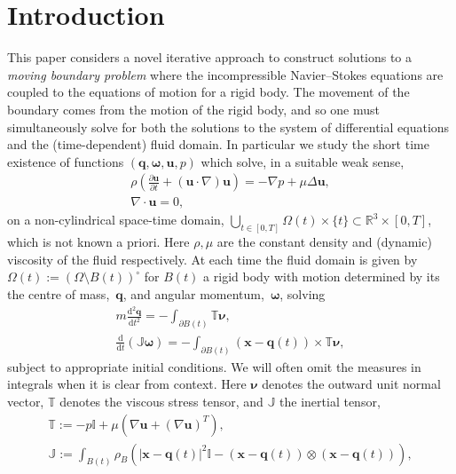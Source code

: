 \documentclass[a4paper]{amsart}
\numberwithin{equation}{section}
\newcommand{\ddt}[1]{\frac{\partial #1}{\partial t}}
\newcommand{\grad}{\nabla}
\newcommand{\Div}{\nabla \cdot}
\theoremstyle{plain}
\newcommand{\mbf}[1]{\mathbf{#1}}
\newcommand{\mbb}[1]{\mathbb{#1}}
\begin{document}
\section{Introduction}
\label{section: FSI Intro}
This paper considers a novel iterative approach to construct solutions to a \emph{moving boundary problem} where the incompressible Navier--Stokes equations are coupled to the equations of motion for a rigid body.
The movement of the boundary comes from the motion of the rigid body, and so one must simultaneously solve for both the solutions to the system of differential equations and the (time-dependent) fluid domain.
In particular we study the short time existence of functions $(\mbf{q}, \boldsymbol{\omega}, \mbf{u}, p)$ which solve, in a suitable weak sense,
\begin{subequations}
\label{eqn: FSI fluid}
\begin{gather}
	\rho \left( \ddt{\mbf{u}} + (\mbf{u} \cdot \grad) \mbf{u} \right) = - \grad p + \mu \Delta \mbf{u},\label{FSI1}\\
	\Div \mbf{u} = 0,\label{FSI2}
\end{gather}
\end{subequations}
on a non-cylindrical space-time domain, $\bigcup_{t \in [0,T]} \Omega(t) \times \{ t \} \subset \mbb{R}^3 \times [0,T]$, which is not known a priori.
Here $\rho, \mu$ are the constant density and (dynamic) viscosity of the fluid respectively.
At each time the fluid domain is given by $\Omega(t) := (\Omega \setminus B(t))^\circ$ for $B(t)$ a rigid body with motion determined by its the centre of mass,~$\mbf{q}$, and angular momentum,~$\boldsymbol{\omega}$, solving
\begin{subequations}
\label{eqn: FSI rigid body}
\begin{gather}
	m \frac{\mathrm{d}^2 \mbf{q}}{\mathrm{d}t^2} = - \int_{\partial B(t)} \mbb{T} \boldsymbol{\nu},\label{FSI3}\\
	\frac{\mathrm{d}}{\mathrm{d}t} \left( \mbb{J} \boldsymbol{\omega} \right) = - \int_{\partial B(t)} (\mbf{x} - \mbf{q}(t)) \times \mbb{T} \boldsymbol{\nu}, \label{FSI4}
\end{gather}
\end{subequations}
subject to appropriate initial conditions.
We will often omit the measures in integrals when it is clear from context.
Here $\boldsymbol{\nu}$ denotes the outward unit normal vector, $\mbb{T}$ denotes the viscous stress tensor, and $\mbb{J}$ the inertial tensor,
\begin{gather*}
	\mbb{T} := -p \mbb{I} + \mu \left( \grad \mbf{u} + (\grad \mbf{u})^T \right),\\
	\mbb{J} := \int_{B(t)} \rho_B \left( |\mbf{x}-\mbf{q}(t)|^2 \mbb{I} - (\mbf{x} - \mbf{q}(t)) \otimes (\mbf{x} - \mbf{q}(t)) \right),
\end{gather*}
\end{document}
